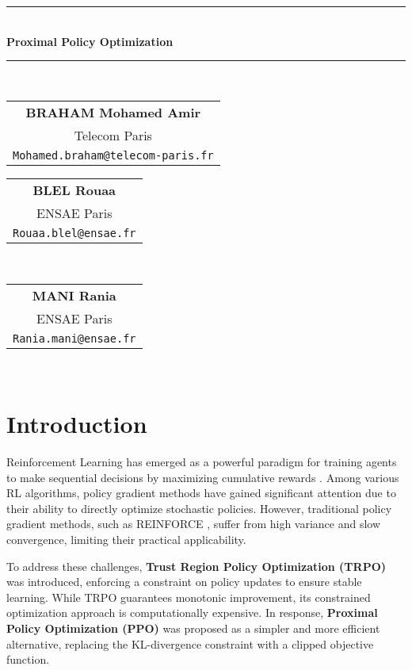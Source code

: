 \documentclass[12pt]{extreport} %
\begin{document}
\begin{center}
    \rule{\textwidth}{2mm} \\[0.5cm]
    {\LARGE \textbf{Proximal Policy Optimization}} \\[0.2cm]
    \rule{\textwidth}{1mm} \\[0.3cm]
    \begin{tabular}{c}
        \textbf{BRAHAM Mohamed Amir} \\ 
        Telecom Paris \\
        \texttt{Mohamed.braham@telecom-paris.fr} \\
    \end{tabular}
    \hspace{2cm}
        \begin{tabular}{c}
        \textbf{BLEL Rouaa} \\ 
        ENSAE Paris \\
        \texttt{Rouaa.blel@ensae.fr} \\
   
    \end{tabular} \\[0.3cm]

         \begin{tabular}{c}
        \textbf{MANI Rania} \\ 
        ENSAE Paris \\
        \texttt{Rania.mani@ensae.fr} \\
    \end{tabular} \\[1cm]
\end{center}
\section{Introduction}
Reinforcement Learning has emerged as a powerful paradigm for training agents to make sequential decisions by maximizing cumulative rewards \cite{sutton2018reinforcement}. Among various RL algorithms, policy gradient methods have gained significant attention due to their ability to directly optimize stochastic policies. However, traditional policy gradient methods, such as REINFORCE \cite{williams1992simple}, suffer from high variance and slow convergence, limiting their practical applicability.

To address these challenges, \textbf{Trust Region Policy Optimization (TRPO)} \cite{schulman2015trust} was introduced, enforcing a constraint on policy updates to ensure stable learning. While TRPO guarantees monotonic improvement, its constrained optimization approach is computationally expensive. In response, \textbf{Proximal Policy Optimization (PPO)} \cite{schulman2017proximal} was proposed as a simpler and more efficient alternative, replacing the KL-divergence constraint with a clipped objective function.
\end{document}
